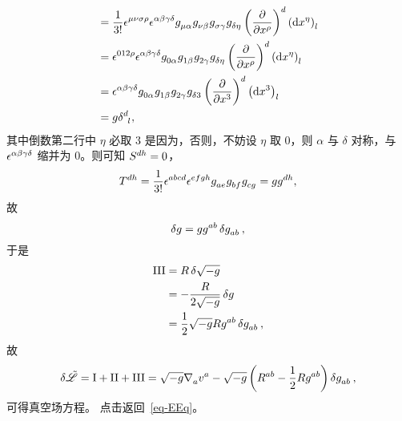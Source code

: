 \begin{Proof}
\begin{equation}
\begin{split}
					&= \frac{1}{3!} \tensor{\nvol}{^\mu^\nu^\sigma^\rho} \tensor{\nvol}{^\alpha^\beta^\gamma^\delta} \tensor{g}{_\mu_\alpha} \tensor{g}{_\nu_\beta} \tensor{g}{_\sigma_\gamma} \tensor{g}{_\delta_\eta} \tensor{\left( \pdv{x^\rho} \right)}{^d} \tensor{\left( \dd{x^\eta} \right)}{_l}\\
					&= \tensor{\nvol}{^0^1^2^\rho} \tensor{\nvol}{^\alpha^\beta^\gamma^\delta} \tensor{g}{_0_\alpha} \tensor{g}{_1_\beta} \tensor{g}{_2_\gamma} \tensor{g}{_\delta_\eta} \tensor{\left( \pdv{x^\rho} \right)}{^d} \tensor{\left( \dd{x^\eta} \right)}{_l}\\
					&= \tensor{\nvol}{^\alpha^\beta^\gamma^\delta} \tensor{g}{_0_\alpha} \tensor{g}{_1_\beta} \tensor{g}{_2_\gamma} \tensor{g}{_\delta_3} \tensor{\left( \pdv{x^3} \right)}{^d} \tensor{\left( \dd{x^3} \right)}{_l}\\
					&= g\tensor{\delta}{^d_l},
				\end{split}
			\end{equation}
			其中倒数第二行中 $\eta$ 必取 $3$ 是因为，否则，不妨设 $\eta$ 取 $0$，则 $\alpha$ 与 $\delta$ 对称，与 $\tensor{\nvol}{^\alpha^\beta^\gamma^\delta}$ 缩并为 $0$。则可知 $\tensor{S}{^d^h}=0$，
			\begin{equation}
				\tensor{T}{^d^h} = \frac{1}{3!} \tensor{\nvol}{^a^b^c^d} \tensor{\nvol}{^e^f^g^h} \tensor{g}{_a_e} \tensor{g}{_b_f} \tensor{g}{_c_g} = g \tensor{g}{^d^h},
			\end{equation}
			故
			\begin{equation}
				\var{g} = g \tensor{g}{^a^b} \var{\tensor{g}{_a_b}},
			\end{equation}
			于是
			\begin{equation}
				\begin{split}
					\RomanNumeralCaps{3} &= R \var{\sqrt{-g}}\\
					&= - \frac{R}{2\sqrt{-g}} \var{g}\\
					&= \frac{1}{2} \sqrt{-g} R \tensor{g}{^a^b} \var{\tensor{g}{_a_b}},
				\end{split}
			\end{equation}
			故
			\begin{equation}
				\var{\Lad} = \RomanNumeralCaps{1} + \RomanNumeralCaps{2} + \RomanNumeralCaps{3} = \sqrt{-g} \Nabla{a} \tensor{v}{^a} - \sqrt{-g} \left( \tensor{R}{^a^b} - \frac{1}{2} R \tensor{g}{^a^b} \right) \var{\tensor{g}{_a_b}},
			\end{equation}
			可得真空场方程。{\normalfont\ttfamily\color{green} 点击返回~\eqref{eq-EEq}。}
		\end{Proof}

